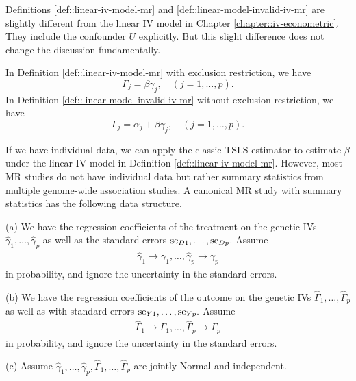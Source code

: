 Definitions \ref{def::linear-iv-model-mr} and \ref{def::linear-model-invalid-iv-mr} are slightly different from the linear IV  model in Chapter \ref{chapter::iv-econometric}. They include the confounder $U$ explicitly. But this slight difference does not change the discussion fundamentally. 


In Definition \ref{def::linear-iv-model-mr} with exclusion restriction, we have 
$$
\Gamma_j = \beta \gamma_j,\quad (j=1,\ldots,p).
$$
In Definition \ref{def::linear-model-invalid-iv-mr} without exclusion restriction, we have 
$$
\Gamma_j = \alpha_j +   \beta \gamma_j,\quad (j=1,\ldots,p). 
$$



If we have individual data, we can apply the classic TSLS estimator to estimate $\beta$ under the linear IV model in Definition \ref{def::linear-iv-model-mr}. However, most MR studies do not have individual data but rather summary statistics from multiple genome-wide association studies. A canonical MR study with summary statistics has the following data structure.


\begin{assumption}
\label{assume::MR-summary}
(a)
We have the regression coefficients of the treatment on the genetic IVs $\hat{\gamma}_1   , \ldots, \hat{\gamma}_p$ as well as the standard errors $\textup{se}_{D1}, \ldots, \textup{se}_{Dp}$. Assume 
\begin{eqnarray}
\label{eq::small-gammas}
\hat{\gamma}_1  \rightarrow \gamma_1 , \ldots, \hat{\gamma}_p \rightarrow \gamma_p
\end{eqnarray}
in probability, and ignore the uncertainty in the standard errors. 

(b)
We have the regression coefficients of the outcome on the genetic IVs $\hat{\Gamma}_1   , \ldots, \hat{\Gamma}_p$ as well as with standard errors $\textup{se}_{Y1}, \ldots, \textup{se}_{Yp}.$ Assume 
\begin{eqnarray}
\label{eq::big-gammas}
\hat{\Gamma}_1 \rightarrow \Gamma_1 , \ldots, \hat{\Gamma}_p \rightarrow \Gamma_p
\end{eqnarray}
in probability, and ignore the uncertainty in the standard errors.  

(c)
Assume $\hat{\gamma}_1   , \ldots, \hat{\gamma}_p, \hat{\Gamma}_1   , \ldots, \hat{\Gamma}_p$ are jointly Normal and independent.
\end{assumption}


